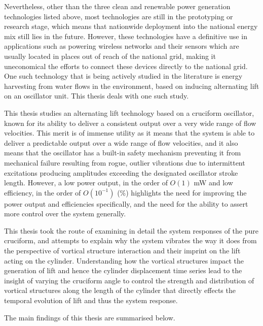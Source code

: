 \documentclass[oneside]{utmthesis}
\begin{document}
Nevertheless, other than the three clean and renewable power generation technologies listed above, most technologies are still in the prototyping or research stage, which means that nationwide deployment into the national energy mix still lies in the future. However, these technologies have a definitive use in applications such as powering wireless networks and their sensors which are usually located in places out of reach of the national grid, making it uneconomical the efforts to connect these devices directly to the national grid. One such technology that is being actively studied in the literature is energy harvesting from water flows in the environment, based on inducing alternating lift on an oscillator unit. This thesis deals with one such study.

This thesis studies an alternating lift technology based on a cruciform oscillator, known for its ability to deliver a consistent output over a very wide range of flow velocities. This merit is of immense utility as it means that the system is able to deliver a predictable output over a wide range of flow velocities, and it also means that the oscillator has a built-in safety mechanism preventing it from mechanical failure resulting from rogue, outlier vibrations due to intermittent excitations producing amplitudes exceeding the designated oscillator stroke length. However, a low power output, in the order of $O(1)$ mW and low efficiency, in the order of $O(10^{-1})$ (\%) highlights the need for improving the power output and efficiencies specifically, and the need for the ability to assert more control over the system generally.

This thesis took the route of examining in detail the system responses of the pure cruciform, and attempts to explain why the system vibrates the way it does from the perspective of vortical structure interaction and their imprint on the lift acting on the cylinder. Understanding how the vortical structures impact the generation of lift and hence the cylinder displacement time series lead to the insight of varying the cruciform angle to control the strength and distribution of vortical structures along the length of the cylinder that directly effects the temporal evolution of lift and thus the system response.

\noindent The main findings of this thesis are summarised below.
\end{document}
